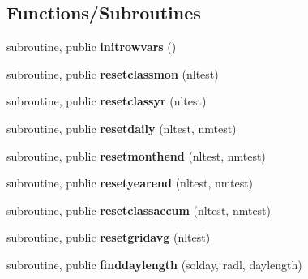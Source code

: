 \subsection*{Functions/\+Subroutines}
\begin{DoxyCompactItemize}
\item 
\hypertarget{namespacectem__statevars_a069aa6fb4b132ef4fe61febb61d40ec1}{}subroutine, public {\bfseries initrowvars} ()\label{namespacectem__statevars_a069aa6fb4b132ef4fe61febb61d40ec1}

\item 
\hypertarget{namespacectem__statevars_ae0b072c8e351526245a583646e778fe6}{}subroutine, public {\bfseries resetclassmon} (nltest)\label{namespacectem__statevars_ae0b072c8e351526245a583646e778fe6}

\item 
\hypertarget{namespacectem__statevars_aeba858367dfd67125a0f77f94496d163}{}subroutine, public {\bfseries resetclassyr} (nltest)\label{namespacectem__statevars_aeba858367dfd67125a0f77f94496d163}

\item 
\hypertarget{namespacectem__statevars_af1d0ff0bbf816233f2b51362f1ccb523}{}subroutine, public {\bfseries resetdaily} (nltest, nmtest)\label{namespacectem__statevars_af1d0ff0bbf816233f2b51362f1ccb523}

\item 
\hypertarget{namespacectem__statevars_afcc1311f7dd0743cf4002b0d2635e824}{}subroutine, public {\bfseries resetmonthend} (nltest, nmtest)\label{namespacectem__statevars_afcc1311f7dd0743cf4002b0d2635e824}

\item 
\hypertarget{namespacectem__statevars_a090f13e5df0ad3551010689fcf82a0ac}{}subroutine, public {\bfseries resetyearend} (nltest, nmtest)\label{namespacectem__statevars_a090f13e5df0ad3551010689fcf82a0ac}

\item 
\hypertarget{namespacectem__statevars_ac5b2a6004c5c8f833b1ec04ef0d8674f}{}subroutine, public {\bfseries resetclassaccum} (nltest, nmtest)\label{namespacectem__statevars_ac5b2a6004c5c8f833b1ec04ef0d8674f}

\item 
\hypertarget{namespacectem__statevars_a424132cbb7cede85302f098c104b6b81}{}subroutine, public {\bfseries resetgridavg} (nltest)\label{namespacectem__statevars_a424132cbb7cede85302f098c104b6b81}

\item 
\hypertarget{namespacectem__statevars_ad9e9f0c26eb20456932853a6fc897631}{}subroutine, public {\bfseries finddaylength} (solday, radl, daylength)\label{namespacectem__statevars_ad9e9f0c26eb20456932853a6fc897631}

\end{DoxyCompactItemize}
